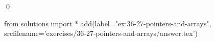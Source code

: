 
\begin{ex}
  \label{ex:36-27-pointers-and-arrays}
  
  \qed
\end{ex}
\begin{python0}
from solutions import *
add(label="ex:36-27-pointers-and-arrays",
    srcfilename='exercises/36-27-pointers-and-arrays/answer.tex')
\end{python0}
